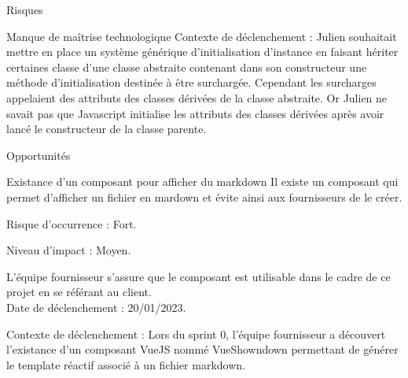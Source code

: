 \documentclass[]{article}
\begin{document}
{\begin{section}{Risques}
\begin{subsection}{Manque de maîtrise technologique}
     Contexte de déclenchement : Julien souhaitait mettre en place un système générique d'initialisation d'instance en faisant hériter certaines classe d'une classe abstraite contenant dans son constructeur une méthode d'initialisation destinée à être surchargée. Cependant les surcharges appelaient des attributs des classes dérivées de la classe abstraite. Or Julien ne savait pas que Javascript initialise les attributs des classes dérivées après avoir lancé le constructeur de la classe parente.
 \end{subsection}
\end{section}

\begin{section}{Opportunités}
 \begin{subsection}{Existance d'un composant pour afficher du markdown}
     Il existe un composant qui permet d'afficher un fichier en mardown et évite ainsi aux fournisseurs de le créer.

     Risque d’occurrence : Fort.

     Niveau d’impact : Moyen.

     L'équipe fournisseur s'assure que le composant est utilisable dans le cadre de ce projet en se référant au client.
     \\[5mm]
     Date de déclenchement : 20/01/2023.

     Contexte de déclenchement : Lors du sprint 0, l'équipe fournisseur a découvert l'existance d'un composant VueJS nommé VueShowndown permettant de générer le template réactif associé à un fichier markdown.
 \end{subsection}
\end{section}
}
\end{document}
